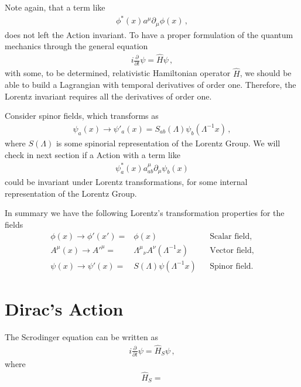 Note again, that a term like
\begin{align}
\label{eq:nolor}
  \phi^*(x)a^\mu\partial_\mu\phi(x)\,,
\end{align}
does not left the Action invariant. To have a proper formulation of the quantum mechanics through the general equation
\begin{align}
  i\frac{\partial}{\partial t}\psi=\hat{H} \psi\,,  
\end{align}
with some, to be determined, relativistic Hamiltonian operator $\widehat{H}$, we should be able to build a Lagrangian with temporal derivatives of order one. Therefore, the Lorentz invariant requires all the derivatives of order one.  

Consider spinor fields, which transforms as
\begin{align}
\label{eq:184qft}
  \psi_a(x)\to\psi'_a(x)=S_{ab}(\Lambda)\psi_b(\Lambda^{-1}x)\,, 
\end{align}
where $S(\Lambda)$ is some spinorial representation of the Lorentz Group. We will check in next section if a Action with a term like
\begin{align}
  \psi^*_a(x)a^\mu_{ab}\partial_\mu\psi_b(x)
\end{align}
could be invariant under Lorentz transformations, for some internal representation of the Lorentz Group.

In summary we have the following Lorentz's transformation properties for the fields
\begin{align}
   \phi(x)\to \phi'(x')=&\phi(x) && \text{Scalar field,}\nonumber\\
   A^\mu(x)\to {A'}^\mu=&{\Lambda^\mu}_\nu A^\nu(\Lambda^{-1}x)&&\text{Vector field,}\nonumber\\
   \psi(x)\to\psi'(x)=&S(\Lambda)\psi(\Lambda^{-1}x)&&\text{Spinor field.}
\end{align}

\section{Dirac's Action}
\label{sec:dirac-equation}
The Scrodinger equation can be written as
\begin{align}
    i\frac{\partial}{\partial t}\psi=\hat{H}_{S} \psi\,,  
\end{align}
where
\begin{align}
  \hat{H}_{S}=
\end{align}


